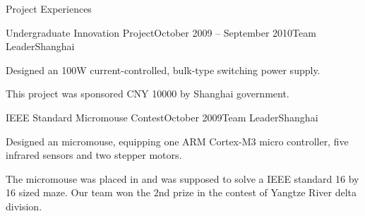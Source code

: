 \documentclass{resume} %
\begin{document}
\begin{rSection}{Project Experiences}
\begin{rSubsection}{Undergraduate Innovation Project}{October 2009 -- September 2010}{Team Leader}{Shanghai}
    \item Designed an 100W current-controlled, bulk-type switching power
        supply.

    \item This project was sponsored CNY 10000 by Shanghai government.

    \end{rSubsection}

    \begin{rSubsection}{IEEE Standard Micromouse Contest}{October 2009}{Team Leader}{Shanghai}

    \item Designed an micromouse, equipping one ARM Cortex-M3 micro controller,
        five infrared sensors and two stepper motors.

    \item The micromouse was placed in and was supposed to solve a IEEE
        standard 16 by 16 sized maze.  Our team won the 2nd prize in the
        contest of Yangtze River delta division.

    \end{rSubsection}

\end{rSection}

\end{document}

